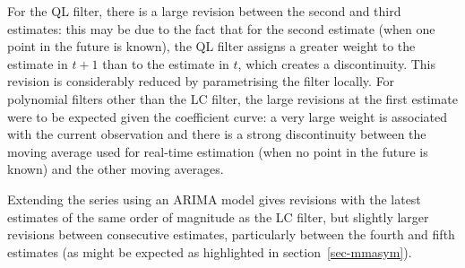 \documentclass[
]{article}
\newcommand\1{\mathds{1}}
\begin{document}
For the QL filter, there is a large revision between the second and
third estimates: this may be due to the fact that for the second
estimate (when one point in the future is known), the QL filter assigns
a greater weight to the estimate in \(t+1\) than to the estimate in
\(t\), which creates a discontinuity. This revision is considerably
reduced by parametrising the filter locally. For polynomial filters
other than the LC filter, the large revisions at the first estimate were
to be expected given the coefficient curve: a very large weight is
associated with the current observation and there is a strong
discontinuity between the moving average used for real-time estimation
(when no point in the future is known) and the other moving averages.

Extending the series using an ARIMA model gives revisions with the
latest estimates of the same order of magnitude as the LC filter, but
slightly larger revisions between consecutive estimates, particularly
between the fourth and fifth estimates (as might be expected as
highlighted in section~\ref{sec-mmasym}).
\end{document}
